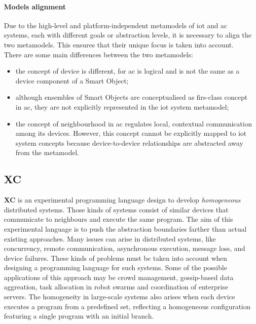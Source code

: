 \paragraph{Models alignment}
Due to the high-level and platform-independent metamodels of \ac{iot} and \ac{ac} systems, each with different goals or
abstraction levels, it is necessary to align the two metamodels.
This ensures that their unique focus is taken into account.
There are some main differences between the two metamodels:
\begin{itemize}
    \item the concept of device is different, for \ac{ac} is logical and is not the same as a device component of a Smart Object;
    \item although ensembles of Smart Objects are conceptualised as firs-class concept in \ac{ac}, they are not explicitly
        represented in the \ac{iot} system metamodel;
    \item the concept of neighbourhood in \ac{ac} regulates local, contextual communication among its devices.
        However, this concept cannot be explicitly mapped to \ac{iot} system concepts because device-to-device relationships
        are abstracted away from the metamodel.
\end{itemize}

\subsection{XC}
\label{subsec:xc}
\textbf{XC} is an experimental programming language design to develop \emph{homogeneous} distributed systems.
Those kinds of systems consist of similar devices that communicate to neighbours and execute the same program.
The aim of this experimental language is to push the abstraction boundaries farther than actual existing approaches.
Many issues can arise in distributed systems, like concurrency, remote communication, asynchronous execution, message
loss, and device failures.
These kinds of problems must be taken into account when designing a programming language for such systems.
Some of the possible applications of this approach may be crowd management, gossip-based data aggreation, task allocation
in robot swarms and coordination of enterprise servers. %
The homogeneity in large-scale systems also arises when each device executes a program from a predefined set, reflecting
a homogeneous configuration featuring a single program with an initial branch.

